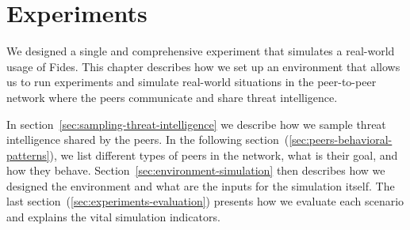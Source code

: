 \chapter{Experiments}
\label{ch:experiments}
We designed a single and comprehensive experiment that simulates a real-world usage of Fides. This chapter describes how we set up an environment that allows us to run experiments and simulate real-world situations in the peer-to-peer network where the peers communicate and share threat intelligence.

In section~\ref{sec:sampling-threat-intelligence} we describe how we sample threat intelligence shared by the peers.
In the following section~(\ref{sec:peers-behavioral-patterns}), we list different types of peers in the network, what is their goal, and how they behave.
Section~\ref{sec:environment-simulation} then describes how we designed the environment and what are the inputs for the simulation itself.
The last section~(\ref{sec:experiments-evaluation}) presents how we evaluate each scenario and explains the vital simulation indicators.







